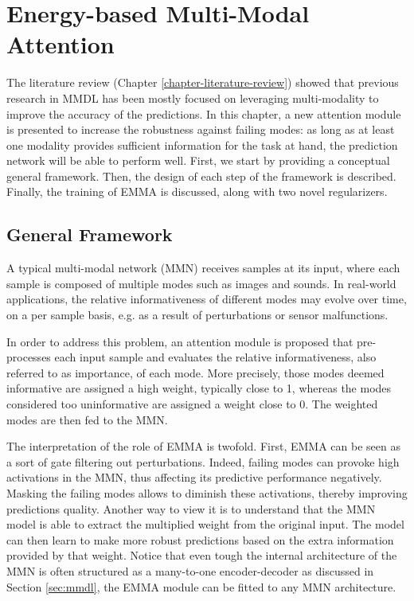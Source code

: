 \chapter{Energy-based Multi-Modal Attention} 
\label{chapter-emma} 

The literature review (Chapter \ref{chapter-literature-review}) showed that previous research in MMDL has been mostly focused on leveraging multi-modality to improve the accuracy of the predictions. In this chapter, a new attention module is presented to increase the robustness against failing modes: as long as at least one modality provides sufficient information for the task at hand, the prediction network will be able to perform well. First, we start by providing a conceptual general framework. Then, the design of each step of the framework is described. Finally, the training of EMMA is discussed, along with two novel regularizers. 


\section{General Framework}\label{sec:general-framework}

A typical multi-modal network (MMN) receives samples at its input, where each sample is composed of multiple modes such as images and sounds. In real-world applications, the relative informativeness of different modes may evolve over time, on a per sample basis, e.g. as a result of perturbations or sensor malfunctions. 

In order to address this problem, an attention module is proposed that pre-processes each input sample and evaluates the relative informativeness, also referred to as importance, of each mode. More precisely, those modes deemed informative are assigned a high weight, typically close to 1, whereas the modes considered too uninformative are assigned a weight close to 0. The weighted modes are then fed to the MMN.

The interpretation of the role of EMMA is twofold. First, EMMA can be seen as a sort of gate filtering out perturbations. Indeed, failing modes can provoke high activations in the MMN, thus affecting its predictive performance negatively. Masking the failing modes allows to diminish these activations, thereby improving predictions quality. Another way to view it is to understand that the MMN model is able to extract the multiplied weight from the original input. The model can then learn to make more robust predictions based on the extra information provided by that weight. Notice that even tough the internal architecture of the MMN is often structured as a many-to-one encoder-decoder as discussed in Section \ref{sec:mmdl}, the EMMA module can be fitted to any MMN architecture.

